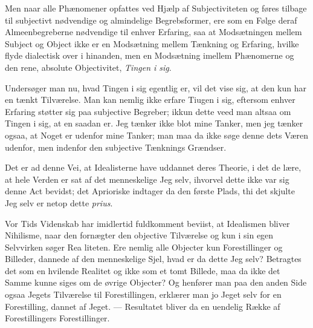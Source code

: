 \documentclass[12pt]{book}
\newcommand{\opage}[1]{\marginnote{\footnotesize\textit{[#1]}}}
\begin{document}
Men naar alle Phænomener opfattes ved Hjælp af Subjectiviteten og føres
tilbage til subjectivt nødvendige og almindelige Begrebsformer, ere som en
Følge deraf Almeenbegreberne nødvendige til enhver Erfaring, saa at
Modsætningen mellem Subject og Object ikke er en Modsætning mellem Tænkning og
Erfaring, hvilke flyde dialectisk over i hinanden, men en Modsætning imellem
Phænomerne og den rene, absolute Objectivitet, \emph{Tingen i sig}.

Undersøger man nu, hvad Tingen i sig egentlig er, vil det vise sig, at den kun
har en tænkt Tilværelse. Man kan nemlig ikke erfare Tiugen i sig, eftersom
enhver Erfaring støtter sig paa subjective Begreber; ikkun dette veed man
altsaa om Tingen i sig, at en saadan er. Jeg tænker ikke blot mine Tanker, men
jeg tænker ogsaa, at Noget er udenfor mine Tanker; man maa da ikke søge denne
dets Væren udenfor, men indenfor den subjective Tænknings Grændser.

Det er ad denne Vei, at Idealisterne have uddannet deres Theorie, i det de
lære, at hele Verden er sat af det menneskelige Jeg selv, ihvorvel dette ikke
var sig denne Act bevidst; det Aprioriske indtager da den første Plads, thi
det skjulte Jeg selv er netop dette \textit{prius}.

Vor Tids Videnskab har imidlertid fuldkomment beviist, at Idealismen bliver
Nihilisme, naar den fornægter den objective Tilværelse og kun i sin egen
Selvvirken søger Rea\-%
\opage{4}liteten. Ere nemlig alle Objecter kun Forestillinger og Billeder, dannede af
den menneskelige Sjel, hvad er da dette Jeg selv? Betragtes det som en hvilende
Realitet og ikke som et tomt Billede, maa da ikke det Samme kunne siges om de
øvrige Objecter? Og henfører man paa den anden Side ogsaa Jegets Tilværelse
til Forestillingen, erklærer man jo Jeget selv for en Forestilling, dannet af
Jeget. --- Resultatet bliver da en uendelig Række af Forestillingers
Forestillinger.
\end{document}
